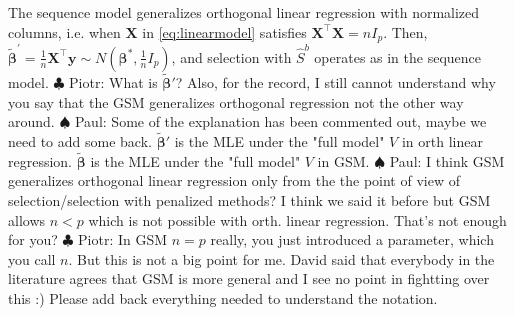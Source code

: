 \documentclass[aos]{imsart}
\theoremstyle{plain}
\newcommand{\piotr}[1]{{\small{\color{red} \sf $\clubsuit$ Piotr: #1}}}
\newcommand{\paul}[1]{{\small{\color{green} \sf $\spadesuit$ Paul: #1}}}
\newcommand{\M}{\mathcal{M}}
\newcommand{\bs}{\boldsymbol}
\begin{document}
The sequence model generalizes orthogonal linear regression with normalized columns, i.e. when $\bs X$ in \eqref{eq:linearmodel} satisfies $\bs X^\top \bs X=n I_p$.
Then, $\tilde{\bs \beta}^{\prime}=\frac{1}{n}\bs X^{\top}\bs y \sim N(\bs \beta^*,\tfrac{1}{n}I_p)$, and selection with $\hat{S}^b$ operates as in the sequence model.\piotr{What is $\tilde{\bs\beta}'$? Also, for the record, I still cannot understand why you say that the GSM generalizes orthogonal regression not the other way around.} \paul{Some of the explanation has been commented out, maybe we need to add some back. $\tilde{\bs\beta}'$ is the MLE under the "full model" $V$ in orth linear regression. $\tilde{\bs \beta}$ is the MLE under the "full model" $V$ in GSM.} \paul{I think GSM generalizes orthogonal linear regression only from the the point of view of selection/selection with penalized methods? I think we said it before but GSM allows $n<p$ which is not possible with orth. linear regression. That's not enough for you?}\piotr{In GSM $n=p$ really, you just introduced a parameter, which you call $n$. But this is not a big point for me. David said that everybody in the literature agrees that GSM is more general and I see no point in fightting over this :) Please add back everything needed to understand the notation. }

\end{document}

